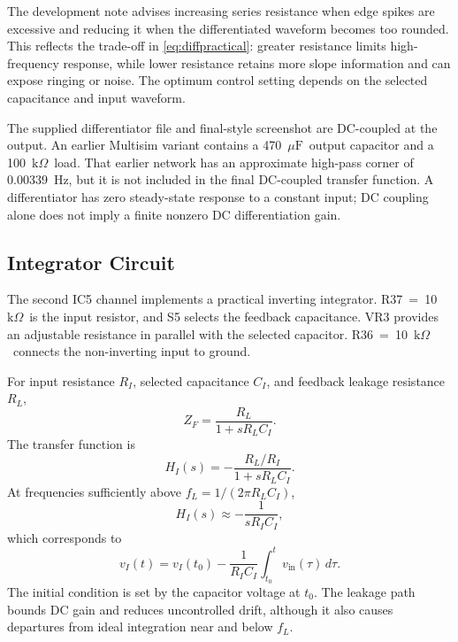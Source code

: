 \documentclass[11pt,a4paper]{article}
\newcommand{\kohm}{\ensuremath{\mathrm{k}\Omega}}
\newcommand{\uF}{\ensuremath{\mu\mathrm{F}}}
\begin{document}
The development note advises increasing series resistance when edge spikes are excessive and reducing it when the differentiated waveform becomes too rounded. This reflects the trade-off in \eqref{eq:diffpractical}: greater resistance limits high-frequency response, while lower resistance retains more slope information and can expose ringing or noise. The optimum control setting depends on the selected capacitance and input waveform.

The supplied differentiator file and final-style screenshot are DC-coupled at the output. An earlier Multisim variant contains a 470~\uF\ output capacitor and a 100~\kohm\ load. That earlier network has an approximate high-pass corner of 0.00339~Hz, but it is not included in the final DC-coupled transfer function. A differentiator has zero steady-state response to a constant input; DC coupling alone does not imply a finite nonzero DC differentiation gain.


\subsection{Integrator Circuit}
The second IC5 channel implements a practical inverting integrator. R37~=~10~\kohm\ is the input resistor, and S5 selects the feedback capacitance. VR3 provides an adjustable resistance in parallel with the selected capacitor. R36~=~10~\kohm\ connects the non-inverting input to ground.

For input resistance $R_I$, selected capacitance $C_I$, and feedback leakage resistance $R_L$,
\begin{equation}
Z_F=\frac{R_L}{1+sR_LC_I}.
\end{equation}
The transfer function is
\begin{equation}
\boxed{H_I(s)=-\frac{R_L/R_I}{1+sR_LC_I}.}
\label{eq:integratorpractical}
\end{equation}
At frequencies sufficiently above $f_L=1/(2\pi R_LC_I)$,
\begin{equation}
H_I(s)\approx-\frac{1}{sR_IC_I},
\end{equation}
which corresponds to
\begin{equation}
v_I(t)=v_I(t_0)-\frac{1}{R_IC_I}\int_{t_0}^{t}v_{\mathrm{in}}(\tau)\,d\tau.
\label{eq:integratortime}
\end{equation}
The initial condition is set by the capacitor voltage at $t_0$. The leakage path bounds DC gain and reduces uncontrolled drift, although it also causes departures from ideal integration near and below $f_L$.
\end{document}
